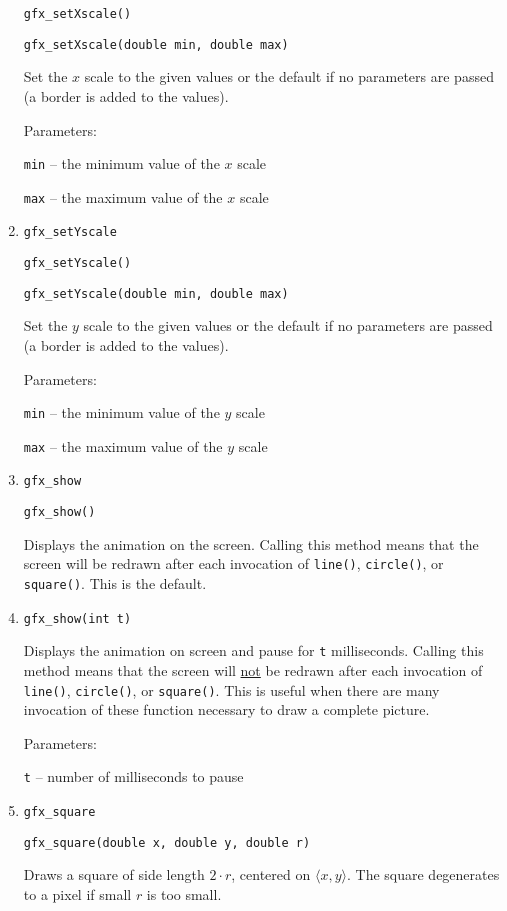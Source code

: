 \begin{enumerate}
      \texttt{gfx\_setXscale()}

      \texttt{gfx\_setXscale(double min, double max)}

      Set the $x$ scale to the given values or the default if no parameters are passed (a border is
      added to the values). 

      Parameters:
      
      \texttt{min} -- the minimum value of the $x$ scale 

      \texttt{max} -- the maximum value of the $x$ scale
\item \texttt{gfx\_setYscale}

      \texttt{gfx\_setYscale()}

      \texttt{gfx\_setYscale(double min, double max)}

      Set the $y$ scale to the given values or the default if no parameters are passed (a border is
      added to the values). 

      Parameters:
      
      \texttt{min} -- the minimum value of the $y$ scale 

      \texttt{max} -- the maximum value of the $y$ scale
\item \texttt{gfx\_show}

      \texttt{gfx\_show()}

      Displays the animation on the screen.   
      Calling this method means that the screen will be redrawn after each 
      invocation of \texttt{line()}, \texttt{circle()}, or \texttt{square()}. This is the default.
\item \texttt{gfx\_show(int t)}
  
      Displays the animation on screen and pause for \texttt{t} milliseconds. Calling this method
      means that the screen will \underline{not} be redrawn after each invocation of 
      \texttt{line()}, \texttt{circle()}, or \texttt{square()}. This is
      useful when there are many invocation of these function necessary to draw a complete picture. 

      Parameters:

      \texttt{t} -- number of milliseconds to pause
\item \texttt{gfx\_square}

      \texttt{gfx\_square(double x, double y, double r)}

      Draws a square of side length $2 \cdot r$, centered on $\langle x, y \rangle$. 
      The square degenerates to a pixel if small $r$ is too small.


\end{enumerate}
